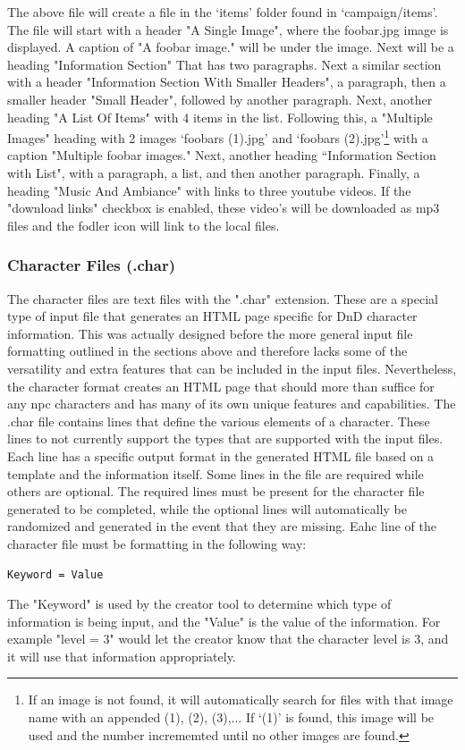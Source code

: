 The above file will create a file in the `items' folder found in `campaign/items'. The file will start with a header "A Single Image", where the foobar.jpg image is displayed. A caption of "A foobar image." will be under the image. Next will be a heading "Information Section" That has two paragraphs. Next a similar section with a header "Information Section With Smaller Headers", a paragraph, then a smaller header "Small Header", followed by another paragraph. Next, another heading "A List Of Items" with 4 items in the list. Following this, a "Multiple Images" heading with 2 images `foobars (1).jpg' and `foobars (2).jpg'\footnote{If an image is not found, it will automatically search for files with that image name with an appended (1), (2), (3),... If `(1)' is found, this image will be used and the number incrememted until no other images are found.} with a caption "Multiple foobar images." Next, another heading ``Information Section with List", with a paragraph, a list, and then another paragraph. Finally, a heading "Music And Ambiance" with links to three youtube videos. If the "download links" checkbox is enabled, these video's will be downloaded as mp3 files and the fodler icon will link to the local files.






\subsubsection{Character Files (.char)}

The character files are text files with the ".char" extension. These are a special type of input file that generates an HTML page specific for DnD character information. This was actually designed before the more general input file formatting outlined in the sections above and therefore lacks some of the versatility and extra features that can be included in the input files. Nevertheless, the character format creates an HTML page that should more than suffice for any npc characters and has many of its own unique features and capabilities. The .char file contains lines that define the various elements of a character. These lines to not currently support the types that are supported with the input files. Each line has a specific output format in the generated HTML file based on a template and the information itself. Some lines in the file are required while others are optional. The required lines must be present for the character file generated to be completed, while the optional lines will automatically be randomized and generated in the event that they are missing. Eahc line of the character file must be formatting in the following way:
\begin{lstlisting}
Keyword = Value
\end{lstlisting}
The "Keyword" is used by the creator tool to determine which type of information is being input, and the "Value" is the value of the information. For example "level = 3" would let the creator know that the character level is 3, and it will use that information appropriately.

